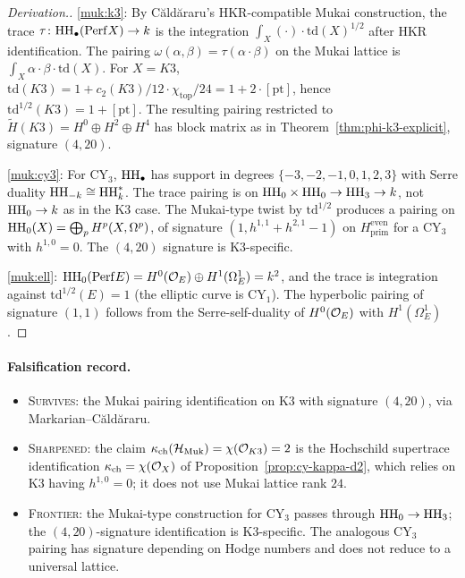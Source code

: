 \begin{proof}[Derivation.]
\ref{muk:k3}: By C\u{a}ld\u{a}raru's HKR-compatible Mukai
construction, the trace
$\tau \colon \mathrm{HH}_\bullet(\mathrm{Perf} X) \to k$ is the integration
$\int_X (\cdot) \cdot \mathrm{td}(X)^{1/2}$ after HKR identification.
The pairing $\omega(\alpha, \beta) = \tau(\alpha \cdot \beta)$
on the Mukai lattice is
$\int_X \alpha \cdot \beta \cdot \mathrm{td}(X)$. For $X = K3$,
$\mathrm{td}(K3) = 1 + c_2(K3)/12 \cdot \chi_{\mathrm{top}}/24 = 1 + 2\cdot[\mathrm{pt}]$,
hence $\mathrm{td}^{1/2}(K3) = 1 + [\mathrm{pt}]$. The resulting
pairing restricted to
$\widetilde{H}(K3) = H^0 \oplus H^2 \oplus H^4$
has block matrix as in
Theorem~\ref{thm:phi-k3-explicit}, signature $(4, 20)$.

\ref{muk:cy3}: For CY$_3$, $\mathrm{HH}_\bullet$ has support in
degrees $\{-3, -2, -1, 0, 1, 2, 3\}$ with Serre duality
$\mathrm{HH}_{-k} \cong \mathrm{HH}_k^*$. The trace pairing is on
$\mathrm{HH}_0 \times \mathrm{HH}_0 \to \mathrm{HH}_3 \to k$, not $\mathrm{HH}_0 \to k$ as in the
K3 case. The Mukai-type twist by $\mathrm{td}^{1/2}$ produces a
pairing on $\mathrm{HH}_0(X) = \bigoplus_p H^p(X, \Omega^p)$, of
signature $(1, h^{1,1} + h^{2,1} - 1)$ on
$H^{\mathrm{even}}_{\mathrm{prim}}$ for a CY$_3$ with
$h^{1,0} = 0$. The $(4, 20)$ signature is K3-specific.

\ref{muk:ell}: $\mathrm{HH}_0(\mathrm{Perf} E) = H^0(\mathcal{O}_E) \oplus H^1(\Omega^1_E) = k^2$,
and the trace is integration against
$\mathrm{td}^{1/2}(E) = 1$ (the elliptic curve is CY$_1$). The
hyperbolic pairing of signature $(1, 1)$ follows from the
Serre-self-duality of $H^0(\mathcal{O}_E)$ with $H^1(\Omega^1_E)$.
\end{proof}

\paragraph{Falsification record.}
\begin{itemize}
\item
\textsc{Survives}: the Mukai pairing identification on K3 with
signature $(4, 20)$, via Markarian--C\u{a}ld\u{a}raru.

\item
\textsc{Sharpened}: the claim
$\kappa_{\mathrm{ch}}(\mathcal{H}_{\mathrm{Muk}}) = \chi(\mathcal{O}_{K3}) = 2$ is the
Hochschild supertrace identification
$\kappa_{\mathrm{ch}} = \chi(\mathcal{O}_X)$ of Proposition~\ref{prop:cy-kappa-d2},
which relies on K3 having $h^{1,0} = 0$; it does not use
Mukai lattice rank $24$.

\item
\textsc{Frontier}: the Mukai-type construction for CY$_3$
passes through $\mathrm{HH}_0 \to \mathrm{HH}_3$; the $(4, 20)$-signature
identification is K3-specific. The analogous CY$_3$ pairing has
signature depending on Hodge numbers and does not reduce to a
universal lattice.
\end{itemize}

